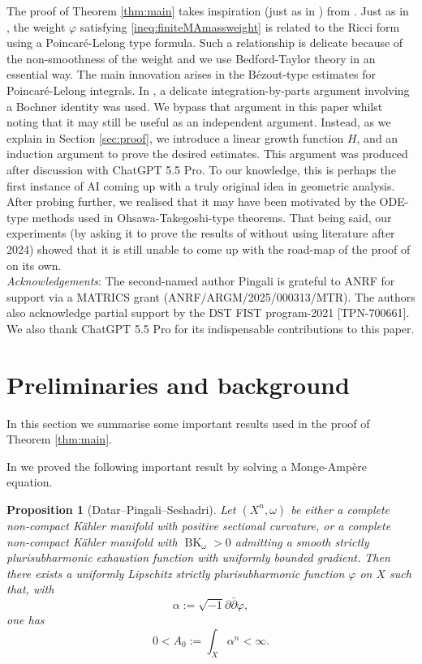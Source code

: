 \documentclass[11pt]{amsart}
\numberwithin{equation}{section}
\newcommand{\ddc}{\sqrt{-1}\partial\bar\partial}
\newcommand{\BK}{\operatorname{BK}}
\theoremstyle{plain}
\newtheorem{proposition}[theorem]{Proposition}
\theoremstyle{remark}
\begin{document}
\indent The proof of Theorem \ref{thm:main} takes inspiration (just as in \cite{DPS}) from \cite{CZ3}. Just as in \cite{DPS}, the weight $\varphi$ satisfying \eqref{ineq:finiteMAmassweight} is related to the Ricci form using a Poincar\'e-Lelong type formula. Such a relationship is delicate because of the non-smoothness of the weight and we use Bedford-Taylor theory in an essential way. The main innovation arises in the B\'ezout-type estimates for Poincar\'e-Lelong integrals. In \cite{DPS}, a delicate integration-by-parts argument involving a Bochner identity was used. We bypass that argument in this paper whilst noting that it may still be useful as an independent argument. Instead, as we explain in Section \ref{sec:proof}, we introduce a linear growth function $H$, and an induction argument to prove the desired estimates. This argument was produced after discussion with ChatGPT 5.5 Pro. To our knowledge, this is perhaps the first instance of AI coming up with a truly original idea in geometric analysis. After probing further, we realised that it may have been motivated by the ODE-type methods used in Ohsawa-Takegoshi-type theorems. That being said, our experiments (by asking it to prove the results of \cite{DPS} without using literature after 2024) showed that it is still unable to come up with the road-map of the proof of \cite{DPS} on its own.\\

\emph{Acknowledgements}: The second-named author Pingali is grateful to ANRF for support via a MATRICS grant (ANRF/ARGM/2025/000313/MTR). The authors also acknowledge partial support by the DST FIST program-2021
[TPN-700661]. We also thank ChatGPT 5.5 Pro for its indispensable contributions to this paper.

\section{Preliminaries and background}\label{sec:prelim}

In this section we summarise some important results used in the proof of Theorem \ref{thm:main}.

\indent In \cite{DPS} we proved the following important result by solving a Monge-Amp\`ere equation.

\begin{proposition}[Datar--Pingali--Seshadri]\label{prop:weight}
Let $(X^n,\omega)$ be either a complete non-compact K\"ahler manifold with positive sectional curvature, or a complete non-compact K\"ahler manifold with $\BK_\omega>0$ admitting a smooth strictly plurisubharmonic exhaustion function with uniformly bounded gradient. Then there exists a uniformly Lipschitz strictly plurisubharmonic function $\varphi$ on $X$ such that, with
\[
        \alpha:=\ddc\varphi,
\]
one has
\[
        0< A_0:=\int_X \alpha^n<\infty .
\]
\end{proposition}
\vspace{5mm}
\end{document}
